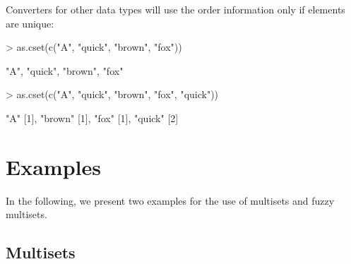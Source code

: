 \documentclass[article]{jss}
\begin{document}
Converters for other data types will use the order information
only if elements are unique:
\begin{Schunk}
\begin{Sinput}
> as.cset(c("A", "quick", "brown", "fox"))
\end{Sinput}
\begin{Soutput}
{"A", "quick", "brown", "fox"}
\end{Soutput}
\begin{Sinput}
> as.cset(c("A", "quick", "brown", "fox", "quick"))
\end{Sinput}
\begin{Soutput}
{"A" [1], "brown" [1], "fox" [1], "quick" [2]}
\end{Soutput}
\end{Schunk}

\section{Examples}
\label{sec:examples}

In the following, we present two examples for the use of multisets
and fuzzy multisets.

\subsection{Multisets}
\end{document}
